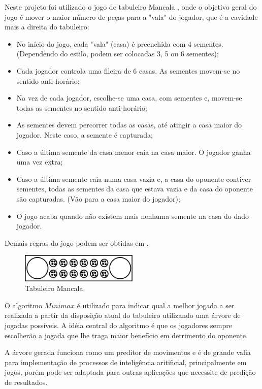 \documentclass[a4paper,11pt]{article}
\begin{document}
Neste projeto foi utilizado o jogo de tabuleiro Mancala\cite{MANCALA, KALAH} , onde o objetivo geral do jogo é mover o maior número de peças para a "vala" do jogador, que é a cavidade mais a direita do tabuleiro:
\begin{itemize}
  \item No início do jogo, cada "vala" (casa) é preenchida com 4 sementes. (Dependendo do estilo, podem ser colocadas 3, 5 ou 6 sementes);
  \item Cada jogador controla uma fileira de 6 casas. As sementes movem-se no sentido anti-horário;
  \item Na vez de cada jogador, escolhe-se uma casa, com sementes e, movem-se todas as sementes no sentido anti-horário;
  \item As sementes devem percorrer todas as casas, até atingir a casa maior do jogador. Neste caso, a semente é capturada;
  \item Caso a última semente da casa menor caia na casa maior. O jogador ganha uma vez extra;
  \item Caso a última semente caia numa casa vazia e, a casa do oponente contiver sementes, todas as sementes da casa que estava vazia e da casa do oponente são capturadas. (Vão para a casa maior do jogador);
  \item O jogo acaba quando não existem mais nenhuma semente na casa do dado jogador.
\end{itemize}
Demais regras do jogo podem ser obtidas em \cite{MANCALA, KALAH}.
\begin{figure}[h!]
    \includegraphics[width=0.5\textwidth]{mancala.pdf}
  \centering
  \caption{Tabuleiro Mancala.}
  \centering

\end{figure}

O algoritmo $Minimax$\cite{MINIMAX} é utilizado para indicar qual a melhor jogada a ser realizada a partir da disposição atual do tabuleiro utilizando uma árvore de jogadas possíveis. A idéia central do algoritmo é que os jogadores sempre escolherão a jogada que lhe traga maior benefício em detrimento do oponente.

A árvore gerada funciona como um preditor de movimentos e é de grande valia para implementação de processos de inteligência aritificial, principalmente em jogos, porém pode ser adaptada para outras aplicações que necessite de predição de resultados.
\end{document}
